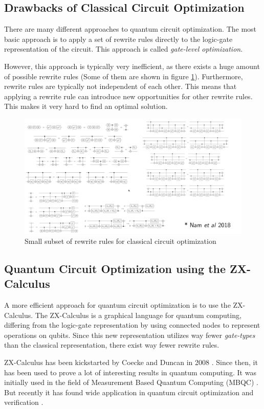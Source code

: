 \subsection{Drawbacks of Classical Circuit Optimization}

There are many different approaches to quantum circuit optimization. The most basic approach is to apply a set of rewrite rules directly to the logic-gate representation of the circuit. This approach is called \textit{gate-level optimization}. \cite{namyross2018automated}

However, this approach is typically very inefficient, as there exists a huge amount of possible rewrite rules (Some of them are shown in figure \ref{fig:rewrite_rules_classical}). Furthermore, rewrite rules are typically not independent of each other. This means that applying a rewrite rule can introduce new opportunities for other rewrite rules. This makes it very hard to find an optimal solution. \cite{alexkissinger2020introductionzx}

\begin{figure}[h]
    \centering
    \includegraphics[width=\linewidth]{images/rewrite_rules_classical.png}
    \caption{Small subset of rewrite rules for classical circuit optimization
            {\cite{alexkissinger2020introductionzx}}}
    \label{fig:rewrite_rules_classical}
\end{figure}


\subsection{Quantum Circuit Optimization using the ZX-Calculus}

A more efficient approach for quantum circuit optimization is to use the ZX-Calculus. The ZX-Calculus is a graphical language for quantum computing, differing from the logic-gate representation by using connected nodes to represent operations on qubits. Since this new representation utilizes way fewer \textit{gate-types} than the classical representation, there exist way fewer rewrite rules.

ZX-Calculus has been kickstarted by Coecke and Duncan in 2008 \cite{Coecke2007graphicalcalculus}. Since then, it has been used to prove a lot of interesting results in quantum computing. It was initially used in the field of Measurement Based Quantum Computing (MBQC) \cite{duncan2012graphical}. But recently it has found wide application in quantum circuit optimization and verification \cite{vandewetering2020zxcalculus}.